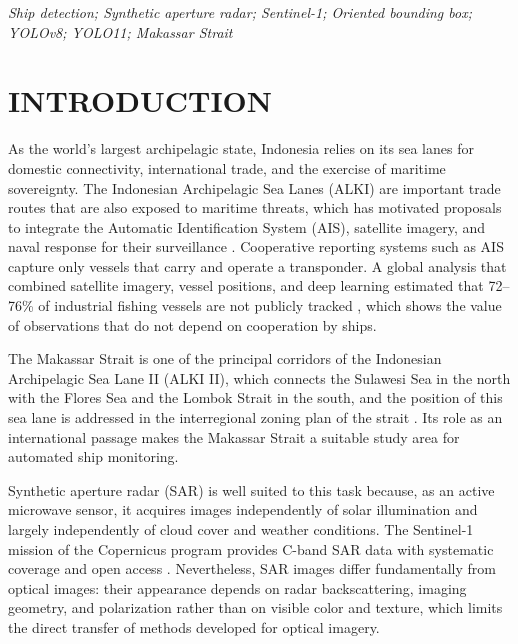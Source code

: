 \documentclass[conference]{IEEEtran}
\begin{document}
\begin{IEEEkeywords}
\textit{Ship detection; Synthetic aperture radar; Sentinel-1; Oriented bounding box; YOLOv8; YOLO11; Makassar Strait}
\end{IEEEkeywords}

\section{INTRODUCTION}
As the world's largest archipelagic state, Indonesia relies on its sea lanes for domestic connectivity, international trade, and the exercise of maritime sovereignty. The Indonesian Archipelagic Sea Lanes (ALKI) are important trade routes that are also exposed to maritime threats, which has motivated proposals to integrate the Automatic Identification System (AIS), satellite imagery, and naval response for their surveillance \cite{wuryantari2026}. Cooperative reporting systems such as AIS capture only vessels that carry and operate a transponder. A global analysis that combined satellite imagery, vessel positions, and deep learning estimated that 72--76\% of industrial fishing vessels are not publicly tracked \cite{paolo2024}, which shows the value of observations that do not depend on cooperation by ships.

The Makassar Strait is one of the principal corridors of the Indonesian Archipelagic Sea Lane II (ALKI II), which connects the Sulawesi Sea in the north with the Flores Sea and the Lombok Strait in the south, and the position of this sea lane is addressed in the interregional zoning plan of the strait \cite{yulia2023}. Its role as an international passage makes the Makassar Strait a suitable study area for automated ship monitoring.

Synthetic aperture radar (SAR) is well suited to this task because, as an active microwave sensor, it acquires images independently of solar illumination and largely independently of cloud cover and weather conditions. The Sentinel-1 mission of the Copernicus program provides C-band SAR data with systematic coverage and open access \cite{torres2012}. Nevertheless, SAR images differ fundamentally from optical images: their appearance depends on radar backscattering, imaging geometry, and polarization rather than on visible color and texture, which limits the direct transfer of methods developed for optical imagery.
\end{document}
